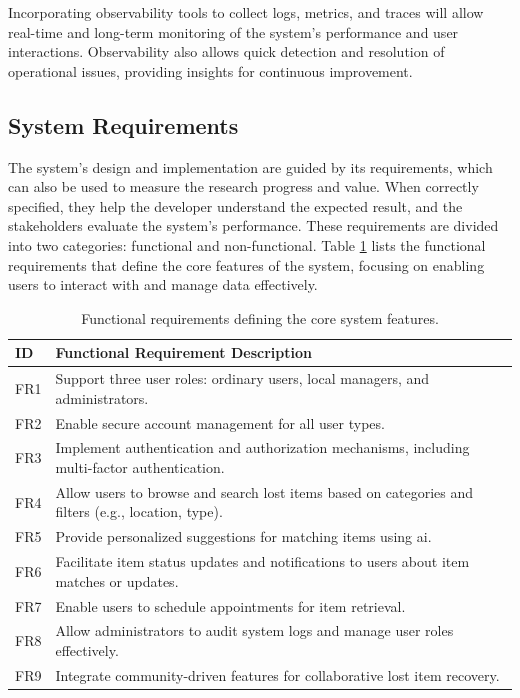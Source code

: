 Incorporating observability tools to collect logs, metrics, and traces will allow real-time and long-term monitoring of the system's performance and user interactions. Observability also allows quick detection and resolution of operational issues, providing insights for continuous improvement.


\subsection{System Requirements} \label{section:requirements}

The system's design and implementation are guided by its requirements, which can also be used to measure the research progress and value. When correctly specified, they help the developer understand the expected result, and the stakeholders evaluate the system's performance. These requirements are divided into two categories: functional and non-functional. Table \ref{tab:functional_requirements} lists the functional requirements that define the core features of the system, focusing on enabling users to interact with and manage data effectively.

\begin{table}[!htb]
\centering
\begin{tabular}{|p{}|p{}|}
\hline
\textbf{ID} & \textbf{Functional Requirement Description} \\ \hline
FR1 & Support three user roles: ordinary users, local managers, and administrators. \\ \hline
FR2 & Enable secure account management for all user types. \\ \hline
FR3 & Implement authentication and authorization mechanisms, including multi-factor authentication. \\ \hline
FR4 & Allow users to browse and search lost items based on categories and filters (e.g., location, type). \\ \hline
FR5 & Provide personalized suggestions for matching items using \ac{ai}. \\ \hline
FR6 & Facilitate item status updates and notifications to users about item matches or updates. \\ \hline
FR7 & Enable users to schedule appointments for item retrieval. \\ \hline
FR8 & Allow administrators to audit system logs and manage user roles effectively. \\ \hline
FR9 & Integrate community-driven features for collaborative lost item recovery. \\ \hline
\end{tabular}
\caption[Functional Requirements]{Functional requirements defining the core system features.}
\label{tab:functional_requirements}
\end{table}


